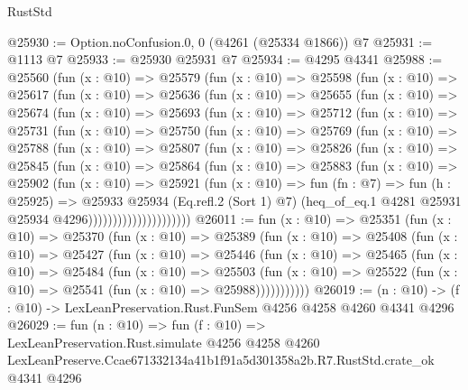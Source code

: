 \begin{lexlean}{RustStd}
\begin{coremodule}
@25930 := Option.noConfusion.{0, 0} (@4261 (@25334 @1866)) @7
@25931 := @1113 @7
@25933 := @25930 @25931 @7
@25934 := @4295 @4341
@25988 := @25560
    (fun (x : @10) =>
    @25579
      (fun (x : @10) =>
      @25598
        (fun (x : @10) =>
        @25617
          (fun (x : @10) =>
          @25636
            (fun (x : @10) =>
            @25655
              (fun (x : @10) =>
              @25674
                (fun (x : @10) =>
                @25693
                  (fun (x : @10) =>
                  @25712
                    (fun (x : @10) =>
                    @25731
                      (fun (x : @10) =>
                      @25750
                        (fun (x : @10) =>
                        @25769
                          (fun (x : @10) =>
                          @25788
                            (fun (x : @10) =>
                            @25807
                              (fun (x : @10) =>
                              @25826
                                (fun (x : @10) =>
                                @25845
                                  (fun (x : @10) =>
                                  @25864
                                    (fun (x : @10) =>
                                    @25883
                                      (fun (x : @10) =>
                                      @25902
                                        (fun (x : @10) =>
                                        @25921
                                          (fun (x : @10) =>
                                          fun (fn : @7) =>
                                          fun (h : @25925) =>
                                          @25933
                                            @25934
                                            (Eq.refl.{2} (Sort 1) @7)
                                            (heq_of_eq.{1}
                                              @4281
                                              @25931
                                              @25934
                                              @4296)))))))))))))))))))))
@26011 := fun (x : @10) =>
  @25351
    (fun (x : @10) =>
    @25370
      (fun (x : @10) =>
      @25389
        (fun (x : @10) =>
        @25408
          (fun (x : @10) =>
          @25427
            (fun (x : @10) =>
            @25446
              (fun (x : @10) =>
              @25465
                (fun (x : @10) =>
                @25484
                  (fun (x : @10) =>
                  @25503
                    (fun (x : @10) =>
                    @25522 (fun (x : @10) => @25541 (fun (x : @10) => @25988)))))))))))
@26019 := (n : @10) -> (f : @10) -> LexLeanPreservation.Rust.FunSem @4256 @4258 @4260 @4341 @4296
@26029 := fun (n : @10) =>
  fun (f : @10) =>
  LexLeanPreservation.Rust.simulate
    @4256
    @4258
    @4260
    LexLeanPreserve.Ccae671332134a41b1f91a5d301358a2b.R7.RustStd.crate_ok
    @4341
    @4296
\end{coremodule}
\end{lexlean}
